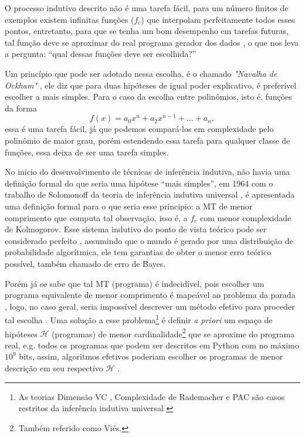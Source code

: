 O processo indutivo descrito não é uma tarefa fácil,
para um número finitos de exemplos existem infinitas funções ($f_c$) que
interpolam perfeitamente todos esses
pontos\cite{bishop2006pattern,abu2012learning}, entretanto, para que se tenha
um bom desempenho em tarefas futuras, tal função deve se aproximar do real
programa gerador dos dados
\cite{mohri2018foundations,goodfellow2016deep,solomonoff1964formal,kearns1994introduction},
o que nos leva a pergunta: ``qual dessas funções deve ser escolhida?''

Um princípio que pode ser adotado nessa escolha, é o chamado \textit{"Navalha
de Ockham"} \cite{blumer1987occam}, ele diz que para duas hipóteses de igual
poder explicativo, é preferível escolher a mais simples. Para o caso
da escolha entre polinômios, isto é, funções da forma
\[f(x) = a_0x^n+a_2x^{n-1}+...+a_n,\]
essa é uma tarefa fácil, já que podemos compará-los em complexidade pelo
polinômio de maior grau, porém estendendo essa tarefa para qualquer classe de
funções, essa deixa de ser uma tarefa simples.

No inicio do desenvolvimento de técnicas de inferência indutiva, não havia uma
definição formal do que seria uma hipótese ``mais simples'', em 1964 com o
trabalho de Solomonoff da teoria de inferência indutiva universal
\cite{solomonoff1964formal}, é apresentada uma definição formal para o que
seria esse principio: a MT de menor comprimento que computa tal observação,
isso é, a $f_c$ com menor complexidade de Kolmogorov. Esse sistema indutivo do
ponto de vista teórico pode ser considerado perfeito \cite{li1992inductive},
assumindo que o mundo é gerado por uma distribuição de probabilidade
algorítmica, ele tem garantias de obter o menor erro teórico possível,
também chamado de erro de Bayes.

Porém já se sabe que tal MT (programa) é indecidível, pois escolher um
programa equivalente de menor comprimento é mapeável ao problema da parada
\cite{sipser2012introduction,solomonoff1978complexity}, logo, no caso geral,
seria impossível descrever um método efetivo para proceder tal escolha
\cite{hutter2004universal}. Uma solução a esse problema\footnote{As teorias
Dimensão VC \cite{vapnik2013nature}, Complexidade de Rademacher
\cite{bartlett2002rademacher} e PAC \cite{valiant1984theory} são casos
restritos da inferência indutiva universal
\cite{li1992inductive,blumer1989learnability}} é definir \textit{a priori} um
espaço de hipóteses $\mathcal{H}$ (programas) de menor
cardinalidade\footnote{Também referido como Viés.} que se aproxime do programa real, e.g. todos os programas que
podem ser descritos em Python com no máximo $10^9$ bits, assim, algoritmos
efetivos poderiam escolher os programas de menor descrição em seu respectivo
$\mathcal{H}$ \cite{rathmanner2011philosophical}.

